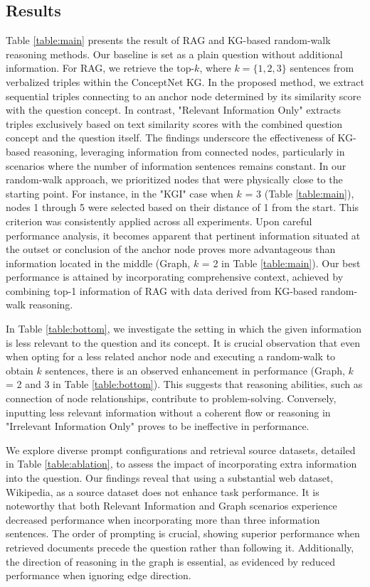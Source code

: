 \documentclass{article}
\begin{document}
\subsection{Results}
Table \ref{table:main} presents the result of RAG and KG-based random-walk reasoning methods. Our baseline is set as a plain question without additional information. For RAG, we retrieve the top-$k$, where $k = \{1, 2, 3\}$ sentences from verbalized triples within the ConceptNet KG. In the proposed method, we extract sequential triples connecting to an anchor node determined by its similarity score with the question concept. In contrast, "Relevant Information Only" extracts triples exclusively based on text similarity scores with the combined question concept and the question itself. The findings underscore the effectiveness of KG-based reasoning, leveraging information from connected nodes, particularly in scenarios where the number of information sentences remains constant. In our random-walk approach, we prioritized nodes that were physically close to the starting point. For instance, in the "KGI" case when $k$ = 3 (Table \ref{table:main}), nodes 1 through 5 were selected based on their distance of 1 from the start. This criterion was consistently applied across all experiments. Upon careful performance analysis, it becomes apparent that pertinent information situated at the outset or conclusion of the anchor node proves more advantageous than information located in the middle (Graph, $k$ = 2 in Table \ref{table:main}). Our best performance is attained by incorporating comprehensive context, achieved by combining top-1 information of RAG with data derived from KG-based random-walk reasoning.



% 


In Table \ref{table:bottom}, we investigate the setting in which the given information is less relevant to the question and its concept. It is crucial observation that even when opting for a less related anchor node and executing a random-walk to obtain $k$ sentences, there is an observed enhancement in performance (Graph, $k$ = 2 and 3 in Table \ref{table:bottom}). This suggests that reasoning abilities, such as connection of node relationships, contribute to problem-solving. Conversely, inputting less relevant information without a coherent flow or reasoning in "Irrelevant Information Only" proves to be ineffective in performance. %

We explore diverse prompt configurations and retrieval source datasets, detailed in Table \ref{table:ablation}, to assess the impact of incorporating extra information into the question. Our findings reveal that using a substantial web dataset, Wikipedia, as a source dataset does not enhance task performance. It is noteworthy that both Relevant Information and Graph scenarios experience decreased performance when incorporating more than three information sentences. The order of prompting is crucial, showing superior performance when retrieved documents precede the question rather than following it. Additionally, the direction of reasoning in the graph is essential, as evidenced by reduced performance when ignoring edge direction.
\end{document}
